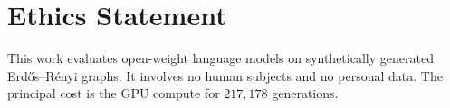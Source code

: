 \documentclass[11pt]{article}
\begin{document}
\section*{Ethics Statement}

This work evaluates open-weight language models on synthetically generated
Erd\H{o}s--R\'enyi graphs. It involves no human subjects and no personal data.
The principal cost is the GPU compute for $217{,}178$ generations.


\end{document}
